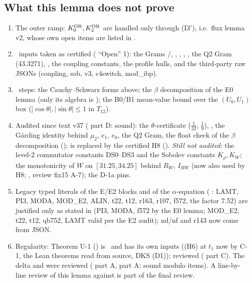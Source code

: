 \documentclass[11pt]{article}
\begin{document}
\subsection{What this lemma does not prove}\label{EI:sec:open}
\begin{enumerate}[leftmargin=*]
\item The outer ramp: $K_0^{\mathrm{OR}},K_2^{\mathrm{OR}}$ are handled only through (I3$'$), i.e.\ flux lemma v2, whose own open items are listed in .
\item \tR\ inputs taken as certified ( ``Open'' 1): the Grams /, , , , , the Q2 Gram (43.3271), , the coupling constants, the profile hulls, and the third-party raw JSONs (coupling, sob, v3, c4switch, mod\_ibp).
\item \tHd\ steps: the Cauchy--Schwarz forms above; the $\beta$ decomposition of the E0 lemma (only its algebra is \tS); the B0/B1 mean-value bound over the $(U_0,U_1)$ box ($|\cos\theta|,|\sin\theta|\le1$ in $T_{12}$).
\item Audited since text v37 ( part D: sound): the $\theta$-certificate ($\frac1{32}$, $\frac19$), , the G\aa rding identity behind $\mu_2$, $e_1$, $e_0$, the Q2 Gram, the float check of the $\beta$ decomposition ();  is replaced by the certified H8 (). \emph{Still not audited:} the level-2 commutator constants DS0--DS3 and the Sobolev constants $K_\rho,K_W$; the monotonicity of $W$ on $[31.25,34.25]$ behind $R_W$, $I_{RW}$ (now also used by H8; \tR, review fix15 A-7); the D-1a pins.
\item Legacy typed literals of the E/E2 blocks and of the $\alpha$-equation ( : LAMT, PI3, MODA, MOD\_E2, ALIN, t22, t12, r163, r107, f572, the factor 7.52) are justified only as stated in  (PI3, MODA, f572 by the E0 lemma; MOD\_E2, t22, t12, qb752, LAMT valid per the E2 audit); nd/nf and r143 now come from JSON.
\item Regularity: Theorem U-1 () is \tHd\ and has its own inputs ((H6) at $t_1$ now by C-1, the Lean theorems read from source, DKS (D1)); reviewed ( part C). The  delta and  were reviewed ( part A,  part A: sound modulo items). A line-by-line review of this lemma against  is part of the final review.
\end{enumerate}

\ifdefined\stepmain\else
\end{document}
